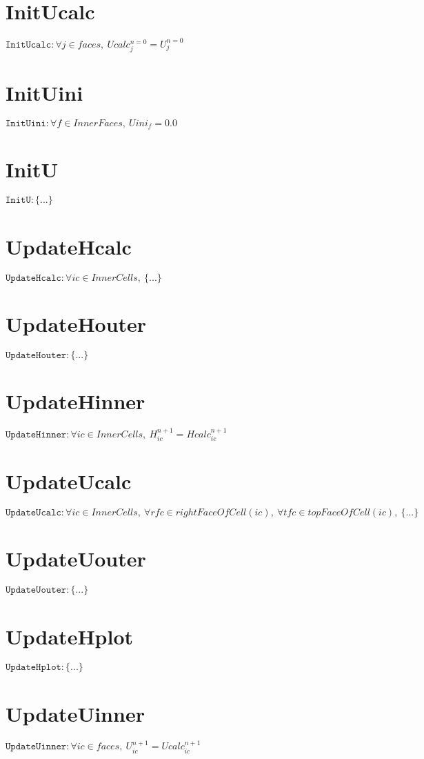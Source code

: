 \documentclass[11pt]{article}
\begin{document}
\section{InitUcalc}
$\texttt{InitUcalc} : \forall{j\in faces}, \ Ucalc^{n=0}_{j} = U^{n=0}_{j}$


\section{InitUini}
$\texttt{InitUini} : \forall{f\in InnerFaces}, \ Uini_{f} = 0.0$


\section{InitU}
$\texttt{InitU} : \{ ... \}$


\section{UpdateHcalc}
$\texttt{UpdateHcalc} : \forall{ic\in InnerCells}, \ \{ ... \}$


\section{UpdateHouter}
$\texttt{UpdateHouter} : \{ ... \}$


\section{UpdateHinner}
$\texttt{UpdateHinner} : \forall{ic\in InnerCells}, \ H^{n+1}_{ic} = Hcalc^{n+1}_{ic}$


\section{UpdateUcalc}
$\texttt{UpdateUcalc} : \forall{ic\in InnerCells}, \ \forall{rfc\in rightFaceOfCell(ic)}, \ \forall{tfc\in topFaceOfCell(ic)}, \ \{ ... \}$


\section{UpdateUouter}
$\texttt{UpdateUouter} : \{ ... \}$


\section{UpdateHplot}
$\texttt{UpdateHplot} : \{ ... \}$


\section{UpdateUinner}
$\texttt{UpdateUinner} : \forall{ic\in faces}, \ U^{n+1}_{ic} = Ucalc^{n+1}_{ic}$
\end{document}
